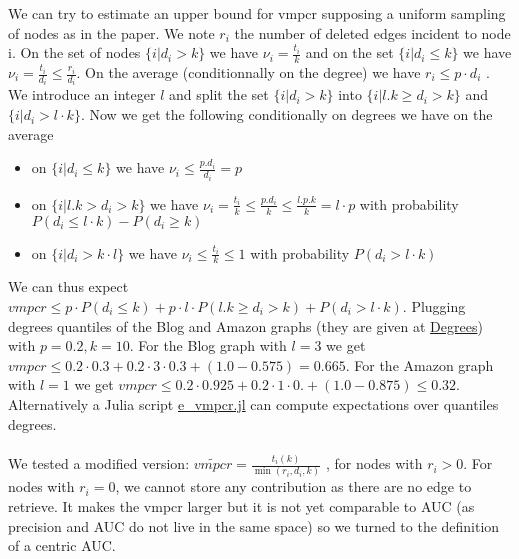\documentclass{article}
\begin{document}
We can try to estimate an upper bound for vmpcr supposing a uniform sampling of nodes as in the paper.
We note $r_{i}$ the number of deleted edges incident to node i.
On the set of nodes $\{i | d_{i} > k\}$ we have $ \nu_{i} = \frac{t_{i}}{k} $ and on the set $\{i | d_{i} \leq k\}$  we have  $ \nu_{i} = \frac{t_{i}}{d_{i}} \leq \frac{r_{i}}{d_{i}}$.
On the average (conditionnally on the degree) we have $ r_{i} \leq p \cdot d_{i} $ . We introduce an integer $l$ and split the set $ \{ i | d_{i} > k  \}$ into  $ \{ i | l . k \ge d_{i} > k  \}$ and $ \{ i |  d_{i} > l \cdot k \}$. Now we get the following conditionally on degrees we have on the average
\begin{itemize}
    \item  on $\{i | d_{i} \leq k\}$ we have $ \nu_{i} \leq \frac{p . d_{i}}{d_{i}} = p$
    \item on  $ \{ i | l . k > d_{i} > k  \}$ we have $ \nu_{i} = \frac{t_{i}}{k} \leq \frac{p.d_{i}}{k} \leq \frac{l.p.k}{k} = l \cdot p $ with probability $P(d_{i} \leq l \cdot k) - P(d_{i} \geq k)$
    \item on $\{i| d_{i} > k \cdot l \}$  we have $ \nu_{i} \leq \frac{t_{i}}{k} \leq 1 $ with probability $ P(d_{i} > l \cdot k) $
\end{itemize}

We can thus expect $ vmpcr \leq p \cdot P(d_{i} \leq k) + p \cdot l \cdot P(l . k \geq d_{i} > k ) + P(d_{i} > l \cdot k)$.
Plugging degrees quantiles of the Blog and Amazon graphs (they are given at  \href{https://github.com/jean-pierreBoth/linkauc}{\color{blue}Degrees})
with $p=0.2, k=10$. For the Blog graph with $l=3$ we get $vmpcr \leq  0.2 \cdot 0.3 + 0.2 \cdot 3 \cdot 0.3 + (1.0-0.575) = 0.665$.
For the Amazon graph with $l = 1$ we get $ vmpcr \leq 0.2 \cdot 0.925 + 0.2 \cdot 1 \cdot 0. + (1.0-0.875) \leq 0.32$.
Alternatively a Julia script \href{https://github.com/jean-pierreBoth/linkauc/Degrees/e\_vmpcr.jl}{\color{blue}e\_vmpcr.jl} can compute expectations over quantiles degrees.

\paragraph{}

We tested  a modified version: $ \widetilde{vmpcr} = \frac{t_{i}(k)}{\min(r_{i}, d_{i}, k)}$ , for nodes with $ r_{i} > 0 $. For nodes with $ r_{i} = 0 $, we cannot store any contribution as there are no edge to retrieve.
It makes the vmpcr larger but it is not yet comparable to AUC (as precision and AUC do not live in the same space) so we turned to the definition of a centric AUC.
\end{document}
